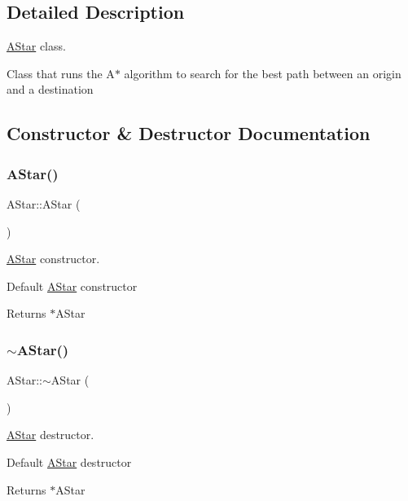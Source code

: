\subsection{Detailed Description}
\mbox{\hyperlink{class_a_star}{A\+Star}} class. 

Class that runs the A$\ast$ algorithm to search for the best path between an origin and a destination 

\subsection{Constructor \& Destructor Documentation}
\mbox{\label{class_a_star_ab7cfaf9e1662f45f5fdce245d28c4508}} 
\subsubsection{\texorpdfstring{A\+Star()}{AStar()}}
{\footnotesize\ttfamily A\+Star\+::\+A\+Star (\begin{DoxyParamCaption}{ }\end{DoxyParamCaption})}



\mbox{\hyperlink{class_a_star}{A\+Star}} constructor. 

Default \mbox{\hyperlink{class_a_star}{A\+Star}} constructor

\begin{DoxyReturn}{Returns}
$\ast$\+A\+Star 
\end{DoxyReturn}
\mbox{\label{class_a_star_ad246668465621db8818bbe3511fa4ae7}} 
\subsubsection{\texorpdfstring{$\sim$\+A\+Star()}{~AStar()}}
{\footnotesize\ttfamily A\+Star\+::$\sim$\+A\+Star (\begin{DoxyParamCaption}{ }\end{DoxyParamCaption})}



\mbox{\hyperlink{class_a_star}{A\+Star}} destructor. 

Default \mbox{\hyperlink{class_a_star}{A\+Star}} destructor

\begin{DoxyReturn}{Returns}
$\ast$\+A\+Star 
\end{DoxyReturn}


